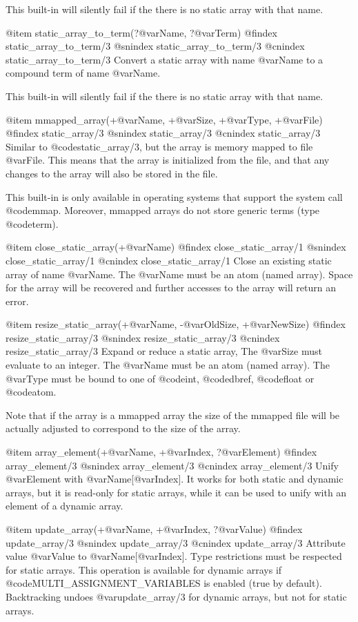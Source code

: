 {{{{{{{This built-in will silently fail if the there is no static array with
that name.

@item static_array_to_term(?@var{Name}, ?@var{Term})
@findex static_array_to_term/3
@snindex static_array_to_term/3
@cnindex static_array_to_term/3
Convert a static array with name
@var{Name} to a compound term of name @var{Name}.

This built-in will silently fail if the there is no static array with
that name.

@item mmapped_array(+@var{Name}, +@var{Size}, +@var{Type}, +@var{File})
@findex static_array/3
@snindex static_array/3
@cnindex static_array/3
Similar to @code{static_array/3}, but the array is memory mapped to file
@var{File}. This means that the array is initialized from the file, and
that any changes to the array will also be stored in the file. 

This built-in is only available in operating systems that support the
system call @code{mmap}. Moreover, mmapped arrays do not store generic
terms (type @code{term}).

@item close_static_array(+@var{Name})
@findex close_static_array/1
@snindex close_static_array/1
@cnindex close_static_array/1
Close an existing static array of name @var{Name}. The @var{Name} must
be an atom (named array). Space for the array will be recovered and
further accesses to the array will return an error. 

@item resize_static_array(+@var{Name}, -@var{OldSize}, +@var{NewSize})
@findex resize_static_array/3
@snindex resize_static_array/3
@cnindex resize_static_array/3
Expand or reduce a static array, The @var{Size} must evaluate to an
integer. The @var{Name} must be an atom (named array). The @var{Type}
must be bound to one of @code{int}, @code{dbref}, @code{float} or
@code{atom}.

Note that if the array is a mmapped array the size of the mmapped file
will be actually adjusted to correspond to the size of the array.

@item array_element(+@var{Name}, +@var{Index}, ?@var{Element})
@findex array_element/3
@snindex array_element/3
@cnindex array_element/3
Unify @var{Element} with @var{Name}[@var{Index}]. It works for both
static and dynamic arrays, but it is read-only for static arrays, while
it can be used to unify with an element of a dynamic array.

@item update_array(+@var{Name}, +@var{Index}, ?@var{Value}) 
@findex update_array/3
@snindex update_array/3
@cnindex update_array/3
Attribute value @var{Value} to @var{Name}[@var{Index}]. Type
restrictions must be respected for static arrays. This operation is
available for dynamic arrays if @code{MULTI_ASSIGNMENT_VARIABLES} is
enabled (true by default). Backtracking undoes @var{update_array/3} for
dynamic arrays, but not for static arrays.

}}}}}}}
